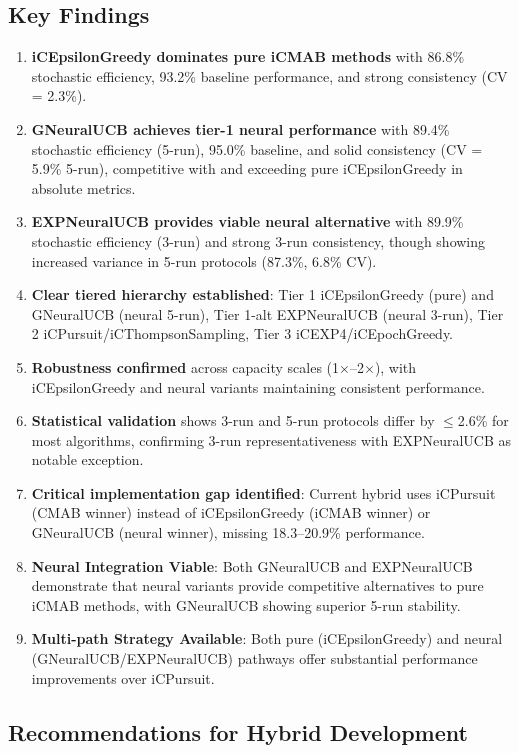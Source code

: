 \documentclass[12pt,a4paper]{article}
\newcommand{\primarytext}[1]{\textcolor{primaryblue}{\textbf{#1}}}
\newcommand{\secondarytext}[1]{\textcolor{secondaryblue}{\textbf{#1}}}
\newcommand{\success}[1]{\textcolor{accentgreen}{\textbf{#1}}}
\newcommand{\warning}[1]{\textcolor{warningred}{\textbf{#1}}}
\newcommand{\legacy}[1]{\textcolor{legacycolor}{\textbf{#1}}}
\newcommand{\neural}[1]{\textcolor{neuralcolor}{\textbf{#1}}}
\begin{document}
\subsection{Key Findings}
\begin{enumerate}
\item \primarytext{iCEpsilonGreedy dominates pure iCMAB methods} with 86.8\% stochastic efficiency, 93.2\% baseline performance, and strong consistency (CV = 2.3\%).
\item \neural{GNeuralUCB achieves tier-1 neural performance} with 89.4\% stochastic efficiency (5-run), 95.0\% baseline, and solid consistency (CV = 5.9\% 5-run), competitive with and exceeding pure iCEpsilonGreedy in absolute metrics.
\item \legacy{EXPNeuralUCB provides viable neural alternative} with 89.9\% stochastic efficiency (3-run) and strong 3-run consistency, though showing increased variance in 5-run protocols (87.3\%, 6.8\% CV).
\item \secondarytext{Clear tiered hierarchy established}: Tier 1 iCEpsilonGreedy (pure) and GNeuralUCB (neural 5-run), Tier 1-alt EXPNeuralUCB (neural 3-run), Tier 2 iCPursuit/iCThompsonSampling, Tier 3 iCEXP4/iCEpochGreedy.
\item \success{Robustness confirmed} across capacity scales (1$\times$--2$\times$), with iCEpsilonGreedy and neural variants maintaining consistent performance.
\item \success{Statistical validation} shows 3-run and 5-run protocols differ by $\leq$2.6\% for most algorithms, confirming 3-run representativeness with EXPNeuralUCB as notable exception.
\item \warning{Critical implementation gap identified}: Current hybrid uses iCPursuit (CMAB winner) instead of iCEpsilonGreedy (iCMAB winner) or GNeuralUCB (neural winner), missing 18.3--20.9\% performance.
\item \neural{Neural Integration Viable}: Both GNeuralUCB and EXPNeuralUCB demonstrate that neural variants provide competitive alternatives to pure iCMAB methods, with GNeuralUCB showing superior 5-run stability.
\item \success{Multi-path Strategy Available}: Both pure (iCEpsilonGreedy) and neural (GNeuralUCB/EXPNeuralUCB) pathways offer substantial performance improvements over iCPursuit.
\end{enumerate}

\subsection{Recommendations for Hybrid Development}
\end{document}
